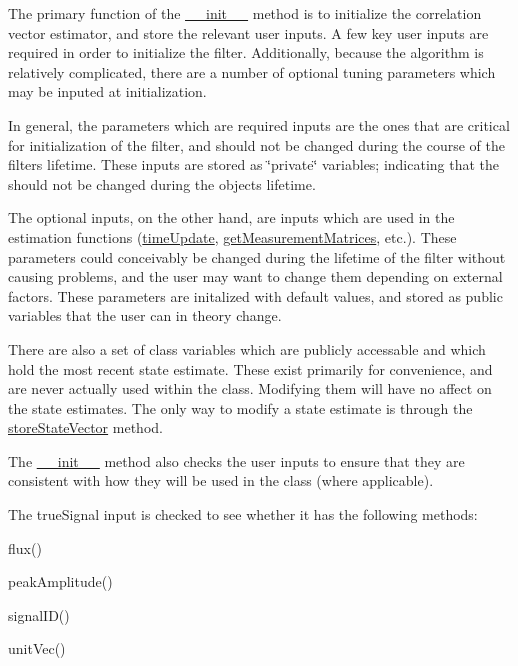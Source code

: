 The primary function of the \hyperlink{classmodest_1_1substates_1_1CorrelationVector_1_1CorrelationVector_a4eab620ee5e44ce3bd1e6809859c3c4f}{\+\_\+\+\_\+init\+\_\+\+\_\+} method is to initialize the correlation vector estimator, and store the relevant user inputs. A few key user inputs are required in order to initialize the filter. Additionally, because the algorithm is relatively complicated, there are a number of optional tuning parameters which may be inputed at initialization.

In general, the parameters which are required inputs are the ones that are critical for initialization of the filter, and should not be changed during the course of the filter\textquotesingle{}s lifetime. These inputs are stored as \char`\"{}private\char`\"{} variables; indicating that the should not be changed during the object\textquotesingle{}s lifetime.

The optional inputs, on the other hand, are inputs which are used in the estimation functions (\hyperlink{classmodest_1_1substates_1_1CorrelationVector_1_1CorrelationVector_a5eb64d242f27e54ed924a957238376b9}{time\+Update}, \hyperlink{classmodest_1_1substates_1_1CorrelationVector_1_1CorrelationVector_a84cd9e342ef4e1d110bb8d76a8f45671}{get\+Measurement\+Matrices}, etc.). These parameters could conceivably be changed during the lifetime of the filter without causing problems, and the user may want to change them depending on external factors. These parameters are initalized with default values, and stored as public variables that the user can in theory change.

There are also a set of class variables which are publicly accessable and which hold the most recent state estimate. These exist primarily for convenience, and are never actually used within the class. Modifying them will have no affect on the state estimates. The only way to modify a state estimate is through the \hyperlink{classmodest_1_1substates_1_1CorrelationVector_1_1CorrelationVector_af028331d6cc55967055b9cf19499c5f2}{store\+State\+Vector} method.

The \hyperlink{classmodest_1_1substates_1_1CorrelationVector_1_1CorrelationVector_a4eab620ee5e44ce3bd1e6809859c3c4f}{\+\_\+\+\_\+init\+\_\+\+\_\+} method also checks the user inputs to ensure that they are consistent with how they will be used in the class (where applicable).

The true\+Signal input is checked to see whether it has the following methods\+:
\begin{DoxyItemize}
\item flux()
\item peak\+Amplitude()
\item signal\+I\+D()
\item unit\+Vec()
\end{DoxyItemize}


